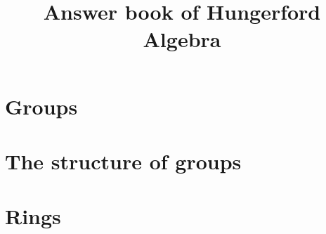 \documentclass[11pt,oneside]{book}
\title{Answer book of Hungerford Algebra}
\author{}
\date{}
\theoremstyle{definition}
\begin{document}
\newtheorem*{tips}{\emph{TIPS}}
\chapter{Groups}










\chapter{The structure of groups}

\chapter{Rings}






\end{document}
